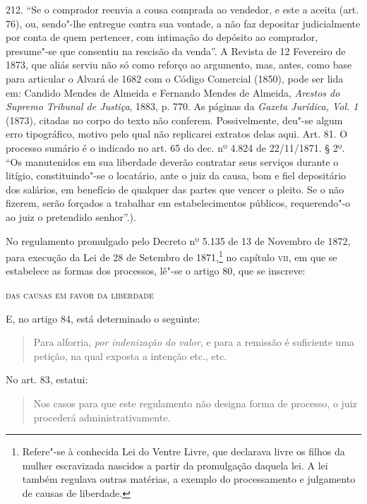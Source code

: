 {  212. ``Se o comprador reenvia a cousa comprada ao vendedor, e este a
  aceita (art. 76), ou, sendo"-lhe entregue contra sua vontade, a não faz
  depositar judicialmente por conta de quem pertencer, com intimação do
  depósito ao comprador, presume"-se que consentiu na rescisão da venda''.
  A Revista de 12 Fevereiro de 1873, que aliás serviu não só como
  reforço ao argumento, mas, antes, como base para articular o
  Alvará de 1682 com o Código Comercial (1850), pode ser lida em: 
 Candido Mendes de Almeida e Fernando Mendes de Almeida,
 \emph{Arestos do Supremo Tribunal de Justiça}, 1883, p. 770. As páginas da
  \emph{Gazeta Jurídica, Vol. 1} (1873), citadas no corpo do texto não
  conferem. Possivelmente, deu"-se algum erro tipográfico, motivo pelo
  qual não replicarei extratos delas aqui. Art. 81. O processo sumário é
  o indicado no art. 65 do dec. nº 4.824 de 22/11/1871. § 2º. ``Os
  manutenidos em sua liberdade deverão contratar seus serviços durante o
  litígio, constituindo"-se o locatário, ante o juiz da causa, bom e fiel
  depositário dos salários, em benefício de qualquer das partes que
  vencer o pleito. Se o não fizerem, serão forçados a trabalhar em
  estabelecimentos públicos, requerendo"-o ao juiz o pretendido senhor''.}).

No regulamento promulgado pelo Decreto nº 5.135 de 13 de Novembro de
1872, para execução da Lei de 28 de Setembro de 1871,\footnote{
  Refere"-se à conhecida Lei do Ventre Livre, que declarava livre os
  filhos da mulher escravizada nascidos a partir da promulgação daquela
  lei. A lei também regulava outras matérias, a exemplo do processamento
  e julgamento de causas de liberdade.} no capítulo \textsc{vii}, em que se
estabelece as formas dos processos, lê"-se o artigo 80, que se inscreve:

\textsc{das causas em favor da liberdade}

E, no artigo 84, está determinado o seguinte:

\begin{quote}
Para alforria, \emph{por indenização do valor}, e para a remissão é
suficiente uma petição, na qual exposta a intenção etc., etc.
\end{quote}

No art. 83, estatui:

\begin{quote}
Nos casos para que este regulamento não designa forma de processo, o
juiz procederá administrativamente.
\end{quote}

